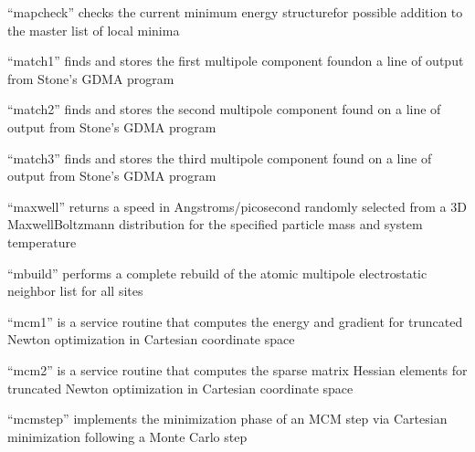 \documentclass[letterpaper,11pt,english]{sphinxmanual}
\begin{document}
\sphinxAtStartPar
{}

\sphinxAtStartPar
“mapcheck” checks the current minimum energy structurefor possible addition to the master list of local minima

\sphinxAtStartPar
{}

\sphinxAtStartPar
“match1” finds and stores the first multipole component foundon a line of output from Stone’s GDMA program

\sphinxAtStartPar
{}

\sphinxAtStartPar
“match2” finds and stores the second multipole component found on a line of output from Stone’s GDMA program

\sphinxAtStartPar
{}

\sphinxAtStartPar
“match3” finds and stores the third multipole component found on a line of output from Stone’s GDMA program

\sphinxAtStartPar
{}

\sphinxAtStartPar
“maxwell” returns a speed in Angstroms/picosecond randomly selected from a 3\sphinxhyphen{}D Maxwell\sphinxhyphen{}Boltzmann distribution for the specified particle mass and system temperature

\sphinxAtStartPar
{}

\sphinxAtStartPar
“mbuild” performs a complete rebuild of the atomic multipole electrostatic neighbor list for all sites

\sphinxAtStartPar
{}

\sphinxAtStartPar
“mcm1” is a service routine that computes the energy and gradient for truncated Newton optimization in Cartesian coordinate space

\sphinxAtStartPar
{}

\sphinxAtStartPar
“mcm2” is a service routine that computes the sparse matrix Hessian elements for truncated Newton optimization in Cartesian coordinate space

\sphinxAtStartPar
{}

\sphinxAtStartPar
“mcmstep” implements the minimization phase of an MCM step via Cartesian minimization following a Monte Carlo step

\sphinxAtStartPar
{}
\end{document}
